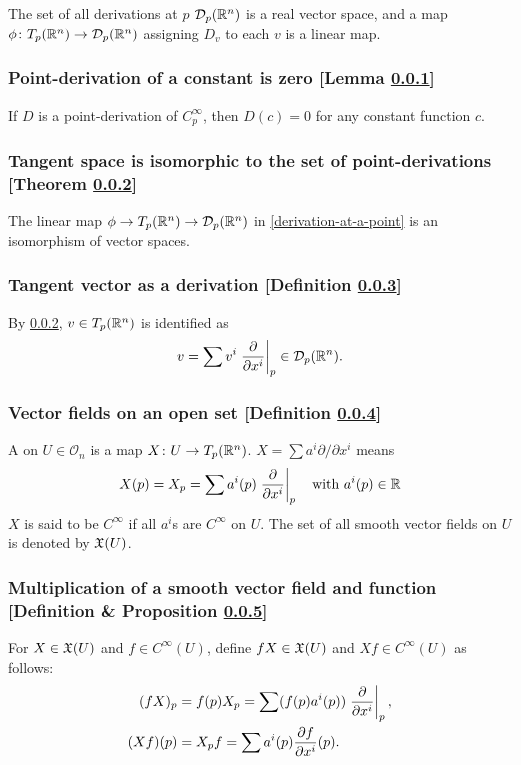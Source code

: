 The set of all derivations at $p$ $\mathcal{D}_p(\mathbb{R}^n)$ is a real vector space, and a map $\phi \colon T_p(\mathbb{R}^n) \to \mathcal{D}_p(\mathbb{R}^n)$ assigning $D_v$ to each $v$ is a linear map.

\subsubsection{Point-derivation of a constant is zero [Lemma \ref{point-derivation-of-a-constant-is-zero}]}\label{point-derivation-of-a-constant-is-zero}
If $D$ is a point-derivation of $C_p^\infty$, then $D(c) = 0$ for any constant function $c$.

\subsubsection{Tangent space is isomorphic to the set of point-derivations [Theorem \ref{tangent-space-is-isomorphic-to-the-set-of-point-derivations}]}\label{tangent-space-is-isomorphic-to-the-set-of-point-derivations}
The linear map $\phi \to T_p(\mathbb{R}^n) \to \mathcal{D}_p(\mathbb{R}^n)$ in \ref{derivation-at-a-point} is an isomorphism of vector spaces.

\subsubsection{Tangent vector as a derivation [Definition \ref{tangent-vector-as-a-derivation}]}\label{tangent-vector-as-a-derivation}
By \ref{tangent-space-is-isomorphic-to-the-set-of-point-derivations}, $v \in T_p(\mathbb{R}^n)$ is identified as
\[
v = \sum v^i \left.\frac{\partial }{\partial x^i}\right|_p \in \mathcal{D}_p(\mathbb{R}^n).
\]

\subsubsection{Vector fields on an open set [Definition \ref{vector-fields-on-an-open-set}]}\label{vector-fields-on-an-open-set}
A  on $U \in \mathcal{O}_n$ is a map $X \colon U \to T_p(\mathbb{R}^n)$. $X = \sum a^i \partial / \partial x^i$ means
\[
X(p) = X_p = \sum a^i(p) \left. \frac{\partial }{\partial x^i} \right|_p \quad \text{with } a^i (p) \in \mathbb{R}
\]
$X$ is said to be $C^\infty$ if all $a^i$s are $C^\infty$ on $U$. The set of all smooth vector fields on $U$ is denoted by $\mathfrak{X}(U)$.

\subsubsection{Multiplication of a smooth vector field and function [Definition \& Proposition \ref{multiplication-of-a-smooth-vector-field-and-function}]}\label{multiplication-of-a-smooth-vector-field-and-function}
For $X \in \mathfrak{X}(U)$ and $f \in C^\infty(U)$, define $fX \in \mathfrak{X}(U)$ and $Xf \in C^\infty(U)$ as follows:
\begin{align*}
(fX)_p &= f(p)X_p = \sum (f(p)a^i(p)) \left. \frac{\partial }{\partial x^i}\right|_p,\\
(Xf)(p) &= X_p f = \sum a^i (p) \frac{\partial f}{\partial x^i} (p).
\end{align*}

